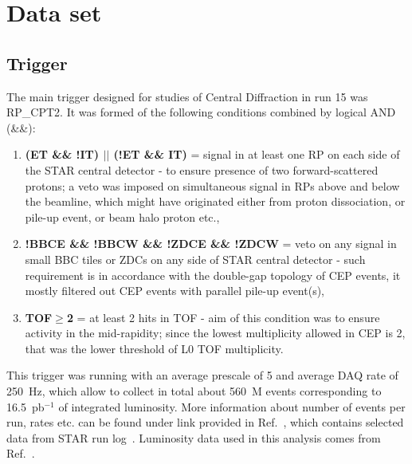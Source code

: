 

\chapter{Data set}\label{chap:dataset}

\section{Trigger}\label{seq:trigger}

The main trigger designed for studies of Central Diffraction in run 15 was RP\_CPT2. It was formed of the following conditions combined by logical AND (\&\&):
\begin{enumerate}
 \item \textbf{(ET \&\& !IT) $||$ (!ET \&\& IT)} = signal in at least one RP on each side of the STAR central detector - to ensure presence of two forward-scattered protons; a veto was imposed on simultaneous signal in RPs above and below the beamline, which might have originated either from proton dissociation, or pile-up event, or beam halo proton etc.,
 \item \textbf{!BBCE \&\& !BBCW \&\& !ZDCE \&\& !ZDCW} = veto on any signal in small BBC tiles or ZDCs on any side of STAR central detector - such requirement is in accordance with the double-gap topology of CEP events, it mostly filtered out CEP events with parallel pile-up event(s),
 \item \textbf{TOF$\geq$2} = at least 2 hits in TOF - aim of this condition was to ensure activity in the mid-rapidity; since the lowest multiplicity allowed in CEP is 2, that was the lower threshold of L0 TOF multiplicity.
\end{enumerate}%
This trigger was running with an average prescale of 5 and average DAQ rate of 250~Hz, which allow to collect in total about 560~M events corresponding to 16.5~pb$^{-1}$ of integrated luminosity.  More information about number of events per run, rates etc. can be found under link provided in Ref.~\cite{onlineRpTriggersMonitoring}, which contains selected data from STAR run log~\cite{RunLog}. Luminosity data used in this analysis comes from Ref.~\cite{Luminosity}.

